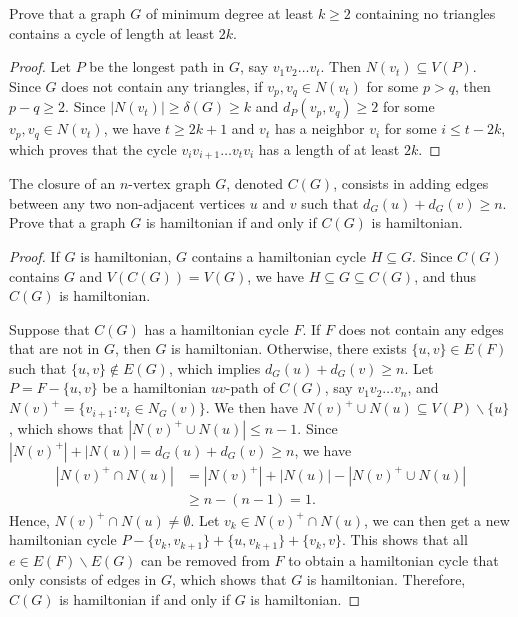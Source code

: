 \documentclass{article}
\newenvironment{problem}[2][Problem]{\begin{trivlist}
\item[\hskip \labelsep {\bfseries #1}\hskip \labelsep {\bfseries #2.}]}{\end{trivlist}}
\begin{document}
\begin{problem}{2.5.7}
    Prove that a graph $G$ of minimum degree at least $k \geq 2$ containing no triangles contains a cycle of length at least $2k$.
\end{problem}
\begin{proof}
    Let $P$ be the longest path in $G$, say $v_1v_2\dots v_t$. Then $N(v_t) \subseteq V(P)$. Since $G$ does not contain any triangles, if $v_p, v_q \in N(v_t)$ for some $p > q$, then $p - q \geq 2$. Since $|N(v_t)| \geq \delta(G) \geq k$ and $d_P(v_p, v_q) \geq 2$ for some $v_p, v_q \in N(v_t)$, we have $t \geq 2k + 1$ and $v_t$ has a neighbor $v_i$ for some $i \leq t - 2k$, which proves that the cycle $v_i v_{i+1}\dots v_t v_i$ has a length of at least $2k$.
\end{proof}

\begin{problem}{2.5.9}
    The closure of an $n$-vertex graph $G$, denoted $C(G)$, consists in adding edges between any two non-adjacent vertices $u$ and $v$ such that $d_G(u)+d_G(v) \geq n$. Prove that a graph $G$ is hamiltonian if and only if $C(G)$ is hamiltonian.
\end{problem}
\begin{proof}
    If $G$ is hamiltonian, $G$ contains a hamiltonian cycle $H \subseteq G$. Since $C(G)$ contains $G$ and $V(C(G)) = V(G)$, we have $H \subseteq G \subseteq C(G)$, and thus $C(G)$ is hamiltonian. 
    
    Suppose that $C(G)$ has a hamiltonian cycle $F$. If $F$ does not contain any edges that are not in $G$, then $G$ is hamiltonian. Otherwise, there exists $\{u, v\} \in E(F)$ such that $\{u, v\} \notin E(G)$, which implies $d_G(u)+d_G(v) \geq n$. Let $P = F - \{u, v\}$ be a hamiltonian $uv$-path of $C(G)$, say $v_1v_2\dots v_n$, and $N(v)^+ = \{v_{i+1} : v_i \in N_G(v)\}$. We then have $N(v)^+ \cup N(u) \subseteq V(P)\backslash \{u\}$, which shows that $|N(v)^+ \cup N(u)| \leq n - 1$. Since $|N(v)^+| + |N(u)| = d_G(u)+d_G(v) \geq n$, we have
    \begin{align}
        |N(v)^+ \cap N(u)|
        &= |N(v)^+| + |N(u)| - |N(v)^+ \cup N(u)| \\
        &\geq n - (n - 1) = 1.
    \end{align}
    Hence, $N(v)^+ \cap N(u) \neq \emptyset$. Let $v_k \in N(v)^+ \cap N(u)$, we can then get a new hamiltonian cycle $P - \{v_k, v_{k+1}\} + \{u, v_{k+1}\} + \{v_k, v\}$. This shows that all $e \in E(F)\backslash E(G)$ can be removed from $F$ to obtain a hamiltonian cycle that only consists of edges in $G$, which shows that $G$ is hamiltonian. Therefore, $C(G)$ is hamiltonian if and only if $G$ is hamiltonian.
\end{proof}
\end{document}
